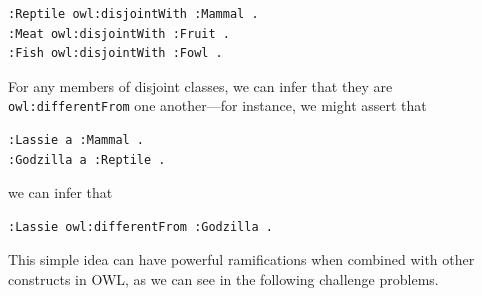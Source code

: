 \begin{lstlisting}
:Reptile owl:disjointWith :Mammal .
:Meat owl:disjointWith :Fruit .
:Fish owl:disjointWith :Fowl .
\end{lstlisting}

For any members of disjoint classes, we can infer that they are
\texttt{owl:differentFrom} one another---for instance, we might assert that

\begin{lstlisting}
:Lassie a :Mammal .
:Godzilla a :Reptile .
\end{lstlisting}

we can infer that

\begin{lstlisting}
:Lassie owl:differentFrom :Godzilla .
\end{lstlisting}

This simple idea can have powerful ramifications when combined with
other constructs in OWL, as we can see in the following challenge
problems.

